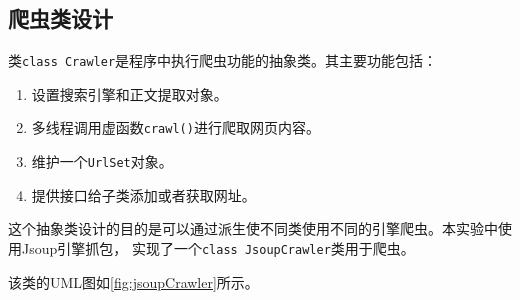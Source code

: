 \documentclass[UTF8,a4paper,12pt]{ctexart}
\begin{document}
\subsection{爬虫类设计}
类\texttt{class Crawler}是程序中执行爬虫功能的抽象类。其主要功能包括：
\begin{enumerate}[label=(\arabic*), wide=2em]
\item 设置搜索引擎和正文提取对象。
\item 多线程调用虚函数\texttt{crawl()}进行爬取网页内容。
\item 维护一个\texttt{UrlSet}对象。
\item 提供接口给子类添加或者获取网址。
\end{enumerate}\par
这个抽象类设计的目的是可以通过派生使不同类使用不同的引擎爬虫。本实验中使用Jsoup引擎抓包，
实现了一个\texttt{class JsoupCrawler}类用于爬虫。\par
该类的UML图如\autoref{fig:jsoupCrawler}所示。\par
\end{document}
